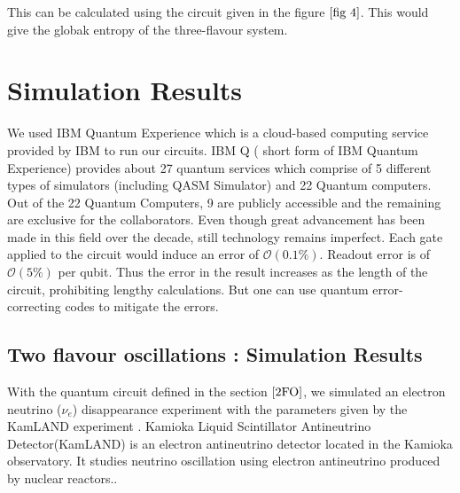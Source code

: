\documentclass[12pt,a4paper]{report}
\begin{document}
This can be calculated using the circuit given in the figure $\ref{fig 4}$. This would give the globak entropy of the three-flavour system.

\newpage
\thispagestyle{empty}
\mbox{}
\newpage
\chapter{Simulation Results}\label{sec5}
We used IBM Quantum Experience which is a cloud-based computing service provided by IBM to run our circuits. IBM Q ( short form of IBM Quantum Experience) provides about 27 quantum services which comprise of 5 different types of simulators (including QASM Simulator) and 22 Quantum computers. Out of the 22 Quantum Computers, 9 are publicly accessible and the remaining are exclusive for the collaborators. Even though great advancement has been made in this field over the decade, still technology remains imperfect. Each gate applied to the circuit would induce an error of $\mathcal{O}(0.1\%)$. Readout error is of $\mathcal{O}(5\%)$ per qubit. Thus the error in the result increases as the length of the circuit, prohibiting lengthy calculations. But one can use quantum error-correcting codes to mitigate the errors. 
\section{Two flavour oscillations : Simulation Results} 
With the quantum circuit defined in the section $\ref{2FO}$, we simulated an electron neutrino ($\nu_{e}$) disappearance experiment with the parameters given by the KamLAND experiment \cite{Eugichi}. Kamioka Liquid Scintillator Antineutrino Detector(KamLAND) is an electron antineutrino detector located in the Kamioka observatory. It studies neutrino oscillation using electron antineutrino produced by nuclear reactors.\cite{Iwamoto}.\par
\end{document}
